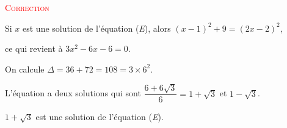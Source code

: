 \documentclass[10pt]{article}
\begin{document}
\begin{enumerate}
		\textcolor{red}{\textsc{Correction}}

		Si $x$ est une solution de l'équation (\textit{E}), alors \quad \mbox{$(x-1)^2+9=(2x-2)^2$},

		ce qui revient à \quad \mbox{$3x^2-6x-6=0$}.

		On calcule \quad \mbox{$\Delta=36+72=108=3\times6^2$}.

		L'équation a deux solutions qui sont \quad  \mbox{$\dfrac{6+6\sqrt3}{6}=1+\sqrt3$} \quad et \quad \mbox{$1-\sqrt3$}.

		\mbox{$1+\sqrt3$} est une solution de l'équation (\textit{E}).
\end{enumerate}
\end{document}
